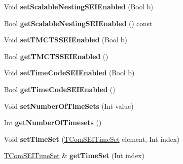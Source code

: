 \begin{DoxyCompactItemize}
\item 
\mbox{\label{class_t_enc_cfg_a4167e7503bb067ddff484d68883c6f4f}} 
Void {\bfseries set\+Scalable\+Nesting\+S\+E\+I\+Enabled} (Bool b)
\item 
\mbox{\label{class_t_enc_cfg_ad2a4a6c3b059958bc3b21322c7aec4a1}} 
Bool {\bfseries get\+Scalable\+Nesting\+S\+E\+I\+Enabled} () const
\item 
\mbox{\label{class_t_enc_cfg_aaaf8101a58dca03bd031da194fb4b603}} 
Void {\bfseries set\+T\+M\+C\+T\+S\+S\+E\+I\+Enabled} (Bool b)
\item 
\mbox{\label{class_t_enc_cfg_a2cac68c0aa4b76ee7622738d43b9359e}} 
Bool {\bfseries get\+T\+M\+C\+T\+S\+S\+E\+I\+Enabled} ()
\item 
\mbox{\label{class_t_enc_cfg_abdedde8ff4c674bdf34f1334cae3e483}} 
Void {\bfseries set\+Time\+Code\+S\+E\+I\+Enabled} (Bool b)
\item 
\mbox{\label{class_t_enc_cfg_a267f0f39d239c060511686e23ed7e5e8}} 
Bool {\bfseries get\+Time\+Code\+S\+E\+I\+Enabled} ()
\item 
\mbox{\label{class_t_enc_cfg_a2b0b6d454e4dc251324df9b12ebe0df8}} 
Void {\bfseries set\+Number\+Of\+Time\+Sets} (Int value)
\item 
\mbox{\label{class_t_enc_cfg_ad033f1e05754dff1c89c2515aa31c70f}} 
Int {\bfseries get\+Number\+Of\+Timesets} ()
\item 
\mbox{\label{class_t_enc_cfg_af633a6f003f3dd7e81e270c49ee93260}} 
Void {\bfseries set\+Time\+Set} (\hyperlink{struct_t_com_s_e_i_time_set}{T\+Com\+S\+E\+I\+Time\+Set} element, Int index)
\item 
\mbox{\label{class_t_enc_cfg_adf56ba46749b6172b6be1617f8957c59}} 
\hyperlink{struct_t_com_s_e_i_time_set}{T\+Com\+S\+E\+I\+Time\+Set} \& {\bfseries get\+Time\+Set} (Int index)
\item 
\mbox{\label{class_t_enc_cfg_afd868be37dbebbb85952cdeec2db2a5e}} 

\end{DoxyCompactItemize}
